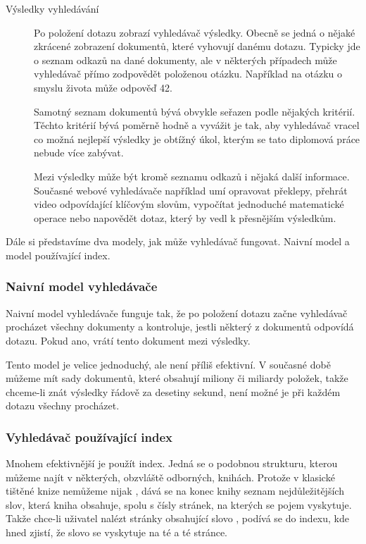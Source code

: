 \documentclass[12pt]{article}
\begin{document}
\begin{description}
\item[Výsledky vyhledávání] Po položení dotazu zobrazí vyhledávač výsledky. Obecně se jedná o nějaké zkrácené zobrazení dokumentů, které vyhovují danému dotazu. Typicky jde o seznam odkazů na dané dokumenty, ale v některých případech může vyhledávač přímo zodpovědět položenou otázku. Například na otázku o smyslu života může odpověď 42. 

Samotný seznam dokumentů bývá obvykle seřazen podle nějakých kritérií. Těchto kritérií bývá poměrně hodně a vyvážit je tak, aby vyhledávač vracel co možná nejlepší výsledky je obtížný úkol, kterým se tato diplomová práce nebude více zabývat. 

Mezi výsledky může být kromě seznamu odkazů i nějaká další informace. Současné webové vyhledávače například umí opravovat překlepy, přehrát video odpovídající klíčovým slovům, vypočítat jednoduché matematické operace nebo napovědět dotaz, který by vedl k přesnějším výsledkům. 
\end{description}


Dále si představíme dva modely, jak může vyhledávač fungovat. Naivní model a model používající index.

\subsubsection{Naivní model vyhledávače}

Naivní model vyhledávače funguje tak, že po položení dotazu začne vyhledávač procházet všechny dokumenty a kontroluje, jestli některý z dokumentů odpovídá dotazu. Pokud ano, vrátí tento dokument mezi výsledky. 

Tento model je velice jednoduchý, ale není příliš efektivní. V současné době můžeme mít sady dokumentů, které obsahují miliony či miliardy položek, takže chceme-li znát výsledky řádově za desetiny sekund, není možné je při každém dotazu všechny procházet.

\subsubsection{Vyhledávač používající index}
Mnohem efektivnější je použít index. Jedná se o podobnou strukturu, kterou můžeme najít v některých, obzvláště odborných, knihách. Protože v klasické tištěné knize nemůžeme nijak , dává se na konec knihy seznam nejdůležitějších slov, která kniha obsahuje, spolu s čísly stránek, na kterých se pojem vyskytuje. Takže chce-li uživatel nalézt stránky obsahující slovo , podívá se do indexu, kde hned zjistí, že slovo se vyskytuje na té a té stránce. 
\end{document}
